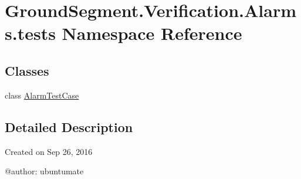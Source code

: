 \hypertarget{namespace_ground_segment_1_1_verification_1_1_alarms_1_1tests}{}\section{Ground\+Segment.\+Verification.\+Alarms.\+tests Namespace Reference}
\label{namespace_ground_segment_1_1_verification_1_1_alarms_1_1tests}
\subsection*{Classes}
\begin{DoxyCompactItemize}
\item 
class \hyperlink{class_ground_segment_1_1_verification_1_1_alarms_1_1tests_1_1_alarm_test_case}{Alarm\+Test\+Case}
\end{DoxyCompactItemize}


\subsection{Detailed Description}
\begin{DoxyVerb}Created on Sep 26, 2016

@author: ubuntumate
\end{DoxyVerb}
 